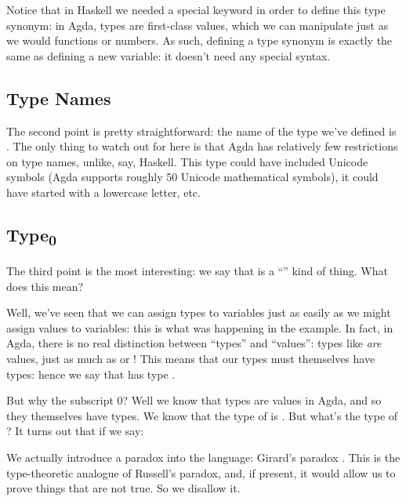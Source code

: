 Notice that in Haskell we needed a special keyword in order to define this type
synonym: in Agda, types are first-class values, which we can manipulate just as
we would functions or numbers.
As such, defining a type synonym is exactly the same as defining a new variable:
it doesn't need any special syntax.
\subsection{Type Names}
The second point is pretty straightforward: the name of the type we've defined
is .
The only thing to watch out for here is that Agda has relatively few
restrictions on type names, unlike, say, Haskell.
This type could have included Unicode symbols (Agda supports roughly 50 Unicode
mathematical symbols), it could have started with a lowercase letter, etc.

\subsection{Type\textsubscript{0}}
The third point is the most interesting: we say that  is a
``'' kind of thing.
What does this mean?

Well, we've seen that we can assign types to variables just as easily as we
might assign values to variables: this is what was happening in the
 example.
In fact, in Agda, there is no real distinction between ``types'' and ``values'':
types like  \emph{are} values, just as much as
 or !
This means that our types must themselves have types: hence we say that
 has type .

But why the subscript 0?
Well we know that types are values in Agda, and so they themselves have types.
We know that the type of  is
.
But what's the type of ?
It turns out that if we say:
We actually introduce a paradox into the language: Girard's paradox
\citep{girardInterpretationFonctionelleElimination1972}.
This is the type-theoretic analogue of Russell's paradox, and, if present, it
would allow us to prove things that are not true.
So we disallow it.

